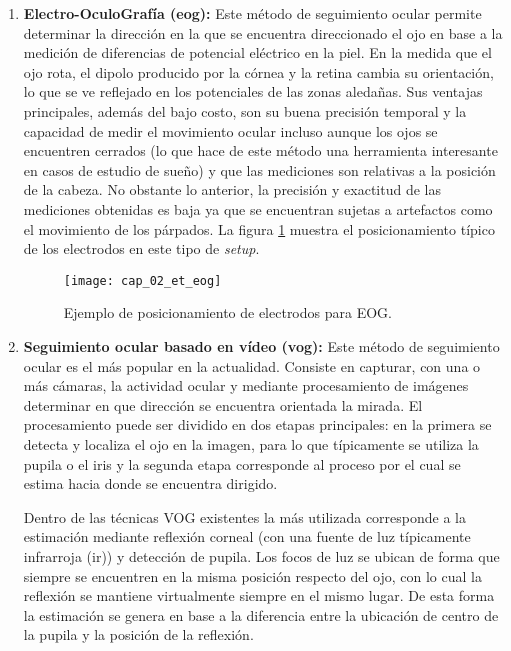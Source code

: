 \documentclass[../main.tex]{subfiles}
\begin{document}
\begin{enumerate}
				\item \textbf{Electro-OculoGrafía (\acrshort{eog}):} Este método de seguimiento ocular permite determinar la dirección en la que se encuentra direccionado el ojo en base a la medición de diferencias de potencial eléctrico en la piel. En la medida que el ojo rota, el dipolo producido por la córnea y la retina cambia su orientación, lo que se ve reflejado en los potenciales de las zonas aledañas. Sus ventajas principales, además del bajo costo, son su buena precisión temporal y la capacidad de medir el movimiento ocular incluso aunque los ojos se encuentren cerrados (lo que hace de este método una herramienta interesante en casos de estudio de sueño) y que las mediciones son relativas a la posición de la cabeza. No obstante lo anterior, la precisión y exactitud de las mediciones obtenidas es baja ya que se encuentran sujetas a artefactos como el movimiento de los párpados. La figura \ref{fig:02_et_eog} muestra el posicionamiento típico de los electrodos en este tipo de \textit{\gls{setup}}. 
				\begin{figure}[H]
					\centering
					\texttt{[image: cap\_02\_et\_eog]}
					\caption[Ejemplo de posicionamiento de electrodos para EOG]{Ejemplo de posicionamiento de electrodos para EOG\footnotemark.}
					\label{fig:02_et_eog}
				\end{figure}

				\item \textbf{Seguimiento ocular basado en vídeo (\acrshort{vog}):} Este método de seguimiento ocular es el más popular en la actualidad. Consiste en capturar, con una o más cámaras, la actividad ocular y mediante procesamiento de imágenes determinar en que dirección se encuentra orientada la mirada. El procesamiento puede ser dividido en dos etapas principales: en la primera se detecta y localiza el ojo en la imagen, para lo que típicamente se utiliza la pupila o el iris y la segunda etapa corresponde al proceso por el cual se estima hacia donde se encuentra dirigido. 

				Dentro de las técnicas VOG existentes la más utilizada corresponde a la estimación mediante reflexión corneal (con una fuente de luz típicamente infrarroja (\acrshort{ir})) y detección de pupila. Los focos de luz se ubican de forma que siempre se encuentren en la misma posición respecto del ojo, con lo cual la reflexión se mantiene virtualmente siempre en el mismo lugar. De esta forma la estimación se genera en base a la diferencia entre la ubicación de centro de la pupila y la posición de la reflexión.  


\end{enumerate}
\end{document}
